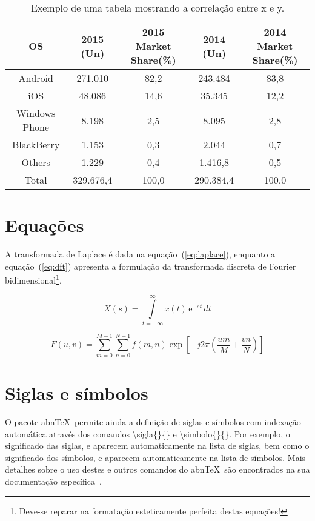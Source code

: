 \begin{table}[!htb]
	\centering
	\caption[Exemplo de uma tabela]{Exemplo de uma tabela mostrando a correla\c{c}\~ao entre x e y.}
	\label{tab:correlacao}
	\begin{tabular}{c|c|c|c|c}
		\hline \SPACE
		\textbf{OS} & \textbf{2015 (Un)}  & \textbf{2015 Market Share(\%)}  & \textbf{2014 (Un)}  & \textbf{2014 Market Share(\%)} \\ \hline \SPACE
		Android & 271.010 & 82,2 & 243.484 & 83,8\\ \hline \SPACE
		iOS & 48.086 & 14,6 & 35.345 & 12,2\\ \hline \SPACE
		Windows Phone & 8.198 & 2,5 & 8.095 & 2,8\\ \hline \SPACE
		BlackBerry & 1.153 & 0,3 & 2.044 & 0,7\\ \hline \SPACE
		Others & 1.229 & 0,4 & 1.416,8 & 0,5\\ \hline \SPACE
		Total & 329.676,4 & 100,0 & 290.384,4 & 100,0\\
		\hline 
	\end{tabular}
\end{table}

\section{Equa\c{c}\~oes}

A transformada de Laplace \'e dada na equa\c{c}\~ao~(\ref{eq:laplace}), enquanto a equa\c{c}\~ao~(\ref{eq:dft}) apresenta a formula\c{c}\~ao da transformada discreta de Fourier bidimensional\footnote{Deve-se reparar na formata\c{c}\~ao esteticamente perfeita destas equa\c{c}\~oes!}.

\begin{equation}
X(s) = \int\limits_{t = -\infty}^{\infty} x(t) \, \text{e}^{-st} \, dt
\label{eq:laplace}
\end{equation}

\begin{equation}
F(u, v) = \sum_{m = 0}^{M - 1} \sum_{n = 0}^{N - 1} f(m, n) \exp \left[ -j 2 \pi \left( \frac{u m}{M} + \frac{v n}{N} \right) \right]
\label{eq:dft}
\end{equation}

\section{Siglas e s\'imbolos}

O pacote abn\TeX\ permite ainda a defini\c{c}\~ao de siglas e s\'imbolos com indexa\c{c}\~ao autom\'atica atrav\'es dos comandos {\ttfamily \textbackslash sigla\{\}\{\}} e {\ttfamily \textbackslash simbolo\{\}\{\}}. Por exemplo, o significado das siglas, e aparecem automaticamente na lista de siglas, bem como o significado dos s\'imbolos, e aparecem automaticamente na lista de s\'imbolos. Mais detalhes sobre o uso destes e outros comandos do abn\TeX\ s\~ao encontrados na sua documenta\c{c}\~ao espec\'ifica~\cite{abnTeX2009}.
